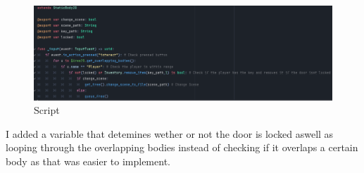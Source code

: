 \documentclass{article}
\begin{document}
        \begin{figure}[H]
                \centering
                \includegraphics[width = 0.9\columnwidth]{images/development/Door_script.PNG}
                \caption{Script}
        \end{figure}
        \noindent I added a variable that detemines wether or not the door is locked aswell as looping through the overlapping bodies instead of checking if it overlaps a certain body as that was easier to implement.\\
\end{document}
